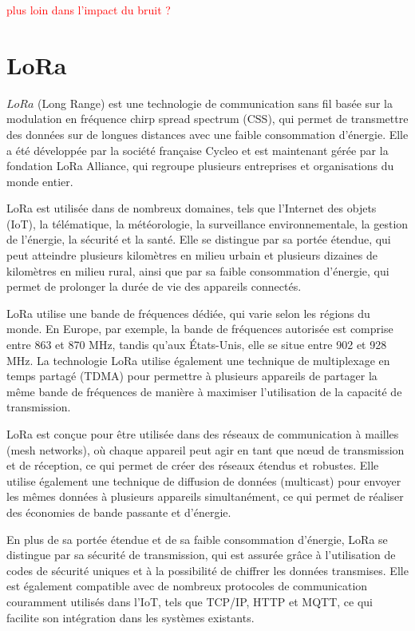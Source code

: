\documentclass[12pt,a4paper,oneside, titlepage]{report}
\begin{document}
\textcolor{red}{plus loin dans l'impact du bruit ?}

\section{LoRa}

$LoRa$ (Long Range) est une technologie de communication sans fil basée sur la modulation en fréquence chirp spread spectrum (CSS), qui permet de transmettre des données sur de longues distances avec une faible consommation d'énergie. Elle a été développée par la société française Cycleo et est maintenant gérée par la fondation LoRa Alliance, qui regroupe plusieurs entreprises et organisations du monde entier.

LoRa est utilisée dans de nombreux domaines, tels que l'Internet des objets (IoT), la télématique, la météorologie, la surveillance environnementale, la gestion de l'énergie, la sécurité et la santé. Elle se distingue par sa portée étendue, qui peut atteindre plusieurs kilomètres en milieu urbain et plusieurs dizaines de kilomètres en milieu rural, ainsi que par sa faible consommation d'énergie, qui permet de prolonger la durée de vie des appareils connectés.

LoRa utilise une bande de fréquences dédiée, qui varie selon les régions du monde. En Europe, par exemple, la bande de fréquences autorisée est comprise entre 863 et 870 MHz, tandis qu'aux États-Unis, elle se situe entre 902 et 928 MHz. La technologie LoRa utilise également une technique de multiplexage en temps partagé (TDMA) pour permettre à plusieurs appareils de partager la même bande de fréquences de manière à maximiser l'utilisation de la capacité de transmission.

LoRa est conçue pour être utilisée dans des réseaux de communication à mailles (mesh networks), où chaque appareil peut agir en tant que nœud de transmission et de réception, ce qui permet de créer des réseaux étendus et robustes. Elle utilise également une technique de diffusion de données (multicast) pour envoyer les mêmes données à plusieurs appareils simultanément, ce qui permet de réaliser des économies de bande passante et d'énergie.

En plus de sa portée étendue et de sa faible consommation d'énergie, LoRa se distingue par sa sécurité de transmission, qui est assurée grâce à l'utilisation de codes de sécurité uniques et à la possibilité de chiffrer les données transmises. Elle est également compatible avec de nombreux protocoles de communication couramment utilisés dans l'IoT, tels que TCP/IP, HTTP et MQTT, ce qui facilite son intégration dans les systèmes existants.
\end{document}
